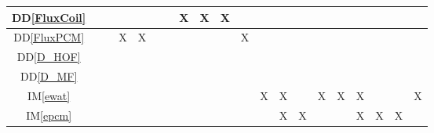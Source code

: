 \documentclass[12pt]{article}
\newcommand{\ddref}[1]{DD\ref{#1}}
\newcommand{\iref}[1]{IM\ref{#1}}
\begin{document}
{\begin{landscape}
\begin{table}[h!]
\begin{tabular}{|c|c|c|c|c|c|c|c|c|c|c|c|c|c|c|c|c|c|c|c|}
				\ddref{FluxCoil}    &                            &                 &                &               &                        &                  & X                  & X              & X               &                   &                 &                   &                     &                  &                &                   &               &                    &                   \\ \hline
				\ddref{FluxPCM}     &                            &                 & X              & X             &                        &                  &                    &                &                 & X                 &                 &                   &                     &                  &                &                   &               &                    &                   \\ \hline
				\ddref{D_HOF}       &                            &                 &                &               &                        &                  &                    &                &                 &                   &                 &                   &                     &                  &                &                   &               &                    &                   \\ \hline
				\ddref{D_MF}        &                            &                 &                &               &                        &                  &                    &                &                 &                   &                 &                   &                     &                  &                &                   &               &                    &                   \\ \hline
				\iref{ewat}         &                            &                 &                &               &                        &                  &                    &                &                 &                   & X               & X                 &                     & X                & X              & X                 &               &                    & X                 \\ \hline
				\iref{epcm}         &                            &                 &                &               &                        &                  &                    &                &                 &                   &                 & X                 & X                   &                  &                & X                 & X             & X                  &                   \\ \hline

\end{tabular}
\end{table}
\end{landscape}}
\end{document}
